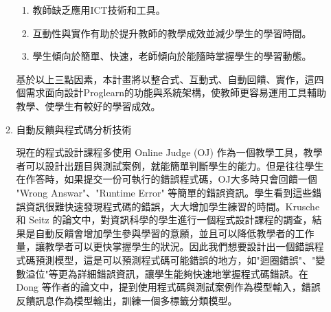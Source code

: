 \documentclass[12pt]{article}
\begin{document}
\begin{enumerate}
\begin{enumerate}
        \begin{enumerate}
          \item 教師缺乏應用ICT技術和工具。
          \item 互動性與實作有助於提升教師的教學成效並減少學生的學習時間。
          \item 學生傾向於簡單、快速，老師傾向於能隨時掌握學生的學習動態。
        \end{enumerate}
        \par 基於以上三點因素，本計畫將以整合式、互動式、自動回饋、實作，這四個需求面向設計Proglearn的功能與系統架構，使教師更容易運用工具輔助教學、使學生有較好的學習成效。
      \item 自動反饋與程式碼分析技術
        \par 現在的程式設計課程多使用 Online Judge (OJ) 作為一個教學工具，教學者可以設計出題目與測試案例，就能簡單判斷學生的能力。但是往往學生在作答時，如果提交一份可執行的錯誤程式碼，OJ大多時只會回饋一個 "Wrong Answar"、"Runtime Error" 等簡單的錯誤資訊。學生看到這些錯誤資訊很難快速發現程式碼的錯誤，大大增加學生練習的時間。Krusche 和 Seitz 的論文\cite{ref16}中，對資訊科學的學生進行一個程式設計課程的調查，結果是自動反饋會增加學生參與學習的意願，並且可以降低教學者的工作量，讓教學者可以更快掌握學生的狀況。因此我們想要設計出一個錯誤程式碼預測模型，這是可以預測程式碼可能錯誤的地方，如"迴圈錯誤"、"變數溢位"等更為詳細錯誤資訊，讓學生能夠快速地掌握程式碼錯誤。在 Dong 等作者的論文\cite{ref17}中，提到使用程式碼與測試案例作為模型輸入，錯誤反饋訊息作為模型輸出，訓練一個多標籤分類模型。
    \end{enumerate}


\end{enumerate}
\end{document}
